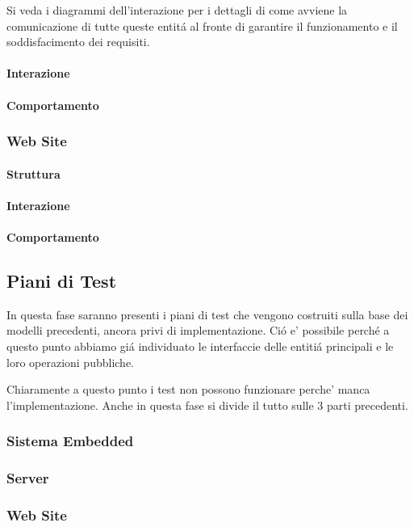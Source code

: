 Si veda i diagrammi dell'interazione per i dettagli di come avviene la comunicazione di tutte queste entit\'a al fronte di garantire il funzionamento e il soddisfacimento dei requisiti.

\paragraph{Interazione}

\paragraph{Comportamento}

\subsubsection{Web Site}

\paragraph{Struttura}

\paragraph{Interazione}

\paragraph{Comportamento}

\subsection{Piani di Test}

In questa fase saranno presenti i piani di test che vengono costruiti sulla base dei modelli precedenti, ancora privi di implementazione. Ci\'o e' possibile perch\'e a questo punto abbiamo gi\'a individuato le interfaccie delle entiti\'a principali e le loro operazioni pubbliche.

Chiaramente a questo punto i test non possono funzionare perche' manca l'implementazione. Anche in questa fase si divide il tutto sulle 3 parti precedenti.

\subsubsection{Sistema Embedded}
\subsubsection{Server}
\subsubsection{Web Site}
